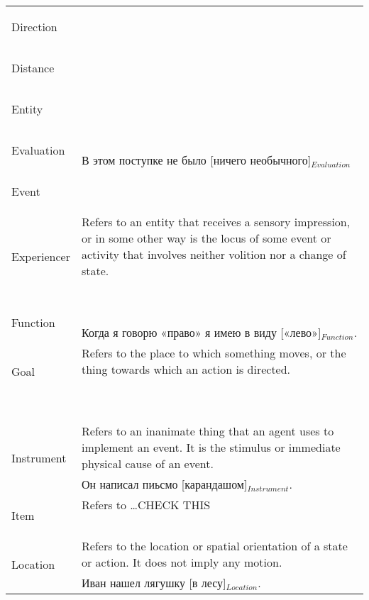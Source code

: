 \documentclass[a4paper,11pt, onecolumn,twoside]{article}
\begin{document}
\begin{longtable}{ p{}  p{} }
\midrule
 \multirow{2}{*}{Direction} & ~ \\ 
        & ~ \\
\midrule
 \multirow{2}{*}{Distance} & ~ \\ 
        & ~ \\
\midrule
 \multirow{2}{*}{Entity} & ~ \\ 
        & ~ \\
\midrule
 \multirow{2}{*}{Evaluation} & ~ \\  
        & В этом поступке не было [ничего необычного]$_{Evaluation}$ \\
\midrule
 \multirow{2}{*}{Event} & ~ \\ 
        & ~ \\
\midrule
 \multirow{2}{*}{Experiencer} & Refers to an entity that receives a sensory impression, or in some other way is the locus of some event or activity that involves neither volition nor a change of state. \\ 
        & ~ \\
\midrule
 \multirow{2}{*}{Function} & ~ \\ 
        & Когда я говорю «право» я имею в виду [«лево»]$_{Function}$. \\
\midrule
 \multirow{2}{*}{Goal} & Refers to the place to which something moves, or the thing towards which an action is directed. \\ 
\midrule
 \multirow{2}{*}{Goer} & ~ \\ 
        & ~ \\
\midrule
 \multirow{2}{*}{Instrument} & Refers to an inanimate thing that an agent uses to implement an event. It is the stimulus or immediate physical cause of an event. \\ 
        & Он написал пиьсмо [карандашом]$_{Instrument}$. \\
\midrule
 \multirow{2}{*}{Item} & Refers to \ldots CHECK THIS \\ 
        & ~ \\
\midrule
 \multirow{2}{*}{Location} & Refers to the location or spatial orientation of a state or action. It does not imply any motion. \\ 
        & Иван нашел лягушку [в лесу]$_{Location}$. \\

\end{longtable}
\end{document}
